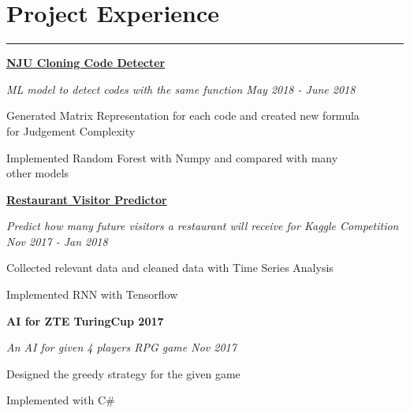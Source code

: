 \documentclass[letterpaper]{article}
\renewenvironment{itemize}{
  \begin{list}{}{
    \setlength{\leftmargin}{1.5em}
  }
}{
  \end{list}
}
\begin{document}
\section*{Project Experience}
\noindent\rule[10pt]{\textwidth}{0.2pt}\vspace{-30pt}
\begin{itemize}
  \setlength{\itemsep}{-2pt}
  \item {\bfseries\href{https://www.kaggle.com/c/nju-introdm/}{NJU Cloning Code Detecter}}
  \item {\it ML model to detect codes with the same function \hfill May 2018 - June 2018} 
  \vspace{-6pt} 
  \begin{itemize}
    \setlength{\itemsep}{-2pt}
    \item[$\circ$] {Generated Matrix Representation for each code and created new formula\\ for Judgement Complexity}
    \item[$\circ$] {Implemented Random Forest with Numpy and compared with many\\ other models} 
  \end{itemize}

  \item {\bfseries \href{https://www.kaggle.com/c/recruit-restaurant-visitor-forecasting}{Restaurant Visitor Predictor}}
  \item {\it Predict how many future visitors a restaurant will receive for {Kaggle Competition} \hfill Nov 2017 - Jan 2018} 
  \vspace{-6pt} 
  \begin{itemize}
    \setlength{\itemsep}{-2pt}
    \item[$\circ$] {Collected relevant data and cleaned data with Time Series Analysis}
    \item[$\circ$] {Implemented RNN with Tensorflow} 
  \end{itemize}

  \item {\bfseries AI for ZTE TuringCup 2017}
  \item {\it An AI for given 4 players RPG game \hfill Nov 2017}
  \vspace{-6pt} 
  \begin{itemize}
    \setlength{\itemsep}{-2pt}
    \item[$\circ$] {Designed the greedy strategy for the given game}
    \item[$\circ$] {Implemented with C\#} 
  \end{itemize}
  
\end{itemize}
\end{document}
